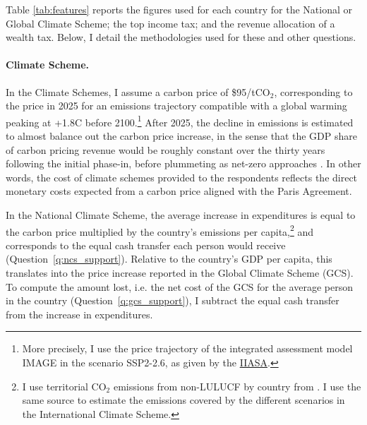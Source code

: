 
Table \ref{tab:features} reports the figures used for each country for the National or Global Climate Scheme; the top income tax; and the revenue allocation of a wealth tax. Below, I detail the methodologies used for these and other questions. 

\begin{table}[!h]
\caption[Country-specific features]{\hypertarget{tab_features}{Country-specific features of the questionnaire}.}\label{tab:features}
\makebox[\textwidth][c]{}
\end{table}

\paragraph{Climate Scheme.} 

In the Climate Schemes, I assume a carbon price of \$95/tCO$_\text{2}$, corresponding to the price in 2025 for an emissions trajectory compatible with a global warming peaking at +1.8\textdegree{}C before 2100.\footnote{More precisely, I use the price trajectory of the integrated assessment model IMAGE in the scenario SSP2-2.6, as given by the \href{https://secure.iiasa.ac.at/web-apps/ene/SspDb/download/iam_v2/SSP_IAM_V2_201811.csv.zip}{IIASA}.} 
After 2025, the decline in emissions is estimated to almost balance out the carbon price increase, in the sense that the GDP share of carbon pricing revenue would be roughly constant over the thirty years following the initial phase-in, before plummeting as net-zero approaches \citep{fabre_global_2024}. In other words, the cost of climate schemes provided to the respondents reflects the direct monetary costs expected from a carbon price aligned with the Paris Agreement.  

In the National Climate Scheme, the average increase in expenditures is equal to the carbon price multiplied by the country's emissions per capita,\footnote{I use territorial CO$_\text{2}$ emissions from non-LULUCF by country from \cite{gutschow_country-resolved_2021}. I use the same source to estimate the emissions covered by the different scenarios in the International Climate Scheme.} and corresponds to the equal cash transfer each person would receive (Question~\ref{q:ncs_support}). Relative to the country's GDP per capita, this translates into the price increase reported in the Global Climate Scheme (GCS). To compute the amount lost, i.e. the net cost of the GCS for the average person in the country (Question~\ref{q:gcs_support}), I subtract the equal cash transfer from the increase in expenditures. 

